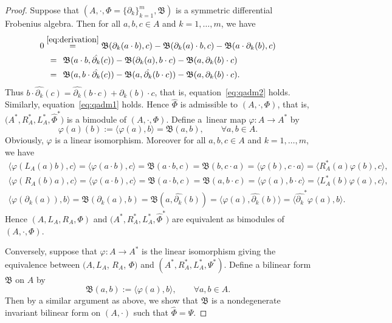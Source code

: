 \documentclass[pdftex]{sigma}
\numberwithin{equation}{section}
\begin{document}
\begin{proof}
 Suppose that $(A, \cdot, \Phi= \{\partial_k\}_{k=1}^m, \mathfrak{B})$ is a symmetric differential Frobenius algebra.
 Then for all $a, b, c \in A$ and $k=1, \dots, m$, we have
 \begin{align*}
 0 &\overset{\eqref{eq:derivation}}{=} \mathfrak{B}(\partial_k(a \cdot b), c) - \mathfrak{B}(\partial_k(a) \cdot b, c)-\mathfrak{B}(a \cdot \partial_k(b), c) \\
 &\overset{\hphantom{(2.1)}}{=} \mathfrak{B}(a \cdot b, \hat{\partial_k}(c)) - \mathfrak{B}(\partial_k(a), b \cdot c) - \mathfrak{B}(a, \partial_k(b) \cdot c) \\
 &\overset{\hphantom{(2.1)}}{=} \mathfrak{B}(a, b \cdot \hat{\partial_k}(c)) - \mathfrak{B}(a, \hat{\partial_k}(b \cdot c)) - \mathfrak{B}(a, \partial_k(b) \cdot c).
 \end{align*}
 Thus $b \cdot \hat{\partial_k}(c) = \hat{\partial_k}(b \cdot c) + \partial_k(b) \cdot c$,
 that is, equation~\eqref{eq:qadm2} holds.
 Similarly, equation~\eqref{eq:qadm1} holds.
 Hence $\hat{\Phi}$ is admissible to $(A, \cdot, \Phi)$, that is,
 $\big(A^*, R_A^*, L_A^*, \hat{\Phi}^*\big)$ is a bimodule of $(A, \cdot, \Phi)$.
 Define a~linear map $\varphi\colon A \to A^*$ by
 \begin{equation*}
 \varphi(a)(b) := \langle \varphi(a), b \rangle = \mathfrak{B}(a, b), \qquad
 \forall a, b \in A.
 \end{equation*}
 Obviously, $\varphi$ is a linear isomorphism.
 Moreover for all $a, b, c \in A$ and $k=1, \dots, m$, we have
 \begin{gather*}
 \langle \varphi(L_A(a)b), c \rangle = \langle \varphi(a \cdot b), c \rangle = \mathfrak{B}(a \cdot b, c) = \mathfrak{B}(b, c \cdot a) = \langle \varphi(b),c \cdot a \rangle = \langle R_A^*(a)\varphi(b), c\rangle, \\
 \langle\varphi(R_A(b)a), c \rangle = \langle \varphi(a \cdot b), c \rangle = \mathfrak{B}(a \cdot b,c)=\mathfrak{B}(a,b \cdot c) = \langle \varphi(a), b \cdot c\rangle = \langle L_A^*(b)\varphi(a), c\rangle, \\
 \langle \varphi(\partial_k(a)), b \rangle = \mathfrak{B}(\partial_k(a), b) = \mathfrak{B}(a, \hat{\partial_k}(b)) = \langle \varphi(a), \hat{\partial_k}(b)\rangle = \langle \hat{\partial_k}^*\varphi(a), b \rangle.
 \end{gather*}
 Hence $(A, L_A, R_A, \Phi)$ and $\big(A^*, R_A^*, L_A^*, \hat{\Phi}^*\big)$ are equivalent as bimodules of $(A, \cdot, \Phi)$.

 Conversely, suppose that $\varphi\colon A \to A^*$ is the linear isomorphism giving the equivalence between $(A, L_A$, $R_A$, $\Phi)$ and $(A^*, R_A^*, L_A^*, \Psi^*)$.
 Define a bilinear form $\mathfrak{B}$ on $A$ by
 \begin{equation*}
 \mathfrak{B}(a, b) := \langle \varphi(a),b \rangle , \qquad \forall a, b \in A.
 \end{equation*}
 Then by a similar argument as above,
 we show that $\mathfrak{B}$ is a nondegenerate invariant bilinear form on $(A, \cdot)$
 such that $\hat{\Phi} = \Psi$.
\end{proof}
\end{document}
